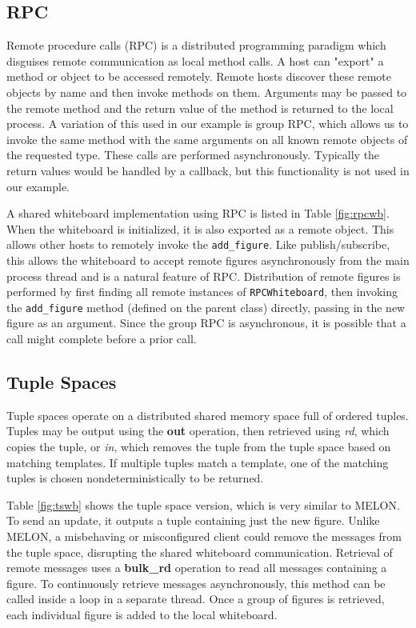 \documentclass{llncs}
\begin{document}
\subsection{RPC}

Remote procedure calls (RPC) is a distributed programming paradigm which disguises remote communication as local method calls. A host can "export" a method or object to be accessed remotely. Remote hosts discover these remote objects by name and then invoke methods on them. Arguments may be passed to the remote method and the return value of the method is returned to the local process. A variation of this used in our example is group RPC, which allows us to invoke the same method with the same arguments on all known remote objects of the requested type. These calls are performed asynchronously. Typically the return values would be handled by a callback, but this functionality is not used in our example.

A shared whiteboard implementation using RPC is listed in Table \ref{fig:rpcwb}. When the whiteboard is initialized, it is also exported as a remote object. This allows other hosts to remotely invoke the \texttt{add\_figure}. Like publish/subscribe, this allows the whiteboard to accept remote figures asynchronously from the main process thread and is a natural feature of RPC. Distribution of remote figures is performed by first finding all remote instances of \texttt{RPCWhiteboard}, then invoking the \texttt{add\_figure} method (defined on the parent class) directly, passing in the new figure as an argument. Since the group RPC is asynchronous, it is possible that a call might complete before a prior call.

\subsection{Tuple Spaces}

Tuple spaces operate on a distributed shared memory space full of ordered tuples. Tuples may be output using the \textbf{out} operation, then retrieved using \textit{rd}, which copies the tuple, or \textit{in}, which removes the tuple from the tuple space based on matching templates. If multiple tuples match a template, one of the matching tuples is chosen nondeterministically to be returned.

Table \ref{fig:tswb} shows the tuple space version, which is very similar to MELON. To send an update, it outputs a tuple containing just the new figure. Unlike MELON, a misbehaving or misconfigured client could remove the messages from the tuple space, disrupting the shared whiteboard communication. Retrieval of remote messages uses a \textbf{bulk\_rd} operation to read all messages containing a figure. To continuously retrieve messages asynchronously, this method can be called inside a loop in a separate thread. Once a group of figures is retrieved, each individual figure is added to the local whiteboard. 
\end{document}
